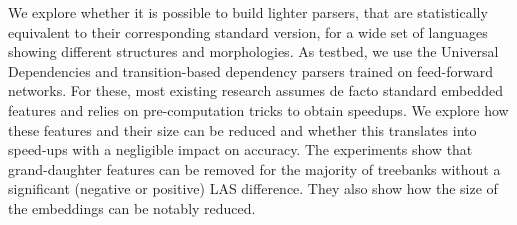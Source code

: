 We explore whether it is possible to build lighter parsers, that are statistically equivalent to their corresponding standard version, for a wide set of languages showing different structures and morphologies. As testbed, we use the Universal Dependencies and transition-based dependency parsers trained on feed-forward networks. For these, most existing research assumes de facto standard embedded features and relies on pre-computation tricks to obtain speedups. We explore how these features and their size can be reduced and whether this translates into speed-ups with a negligible impact on accuracy. The experiments show that grand-daughter features can be removed for the majority of treebanks without a significant (negative or positive) LAS difference. They also show how the size of the embeddings can be notably reduced.
